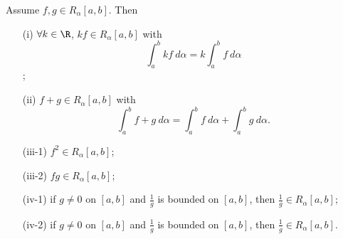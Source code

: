 \begin{theorem}\label{Algebraic properties of R.S integral}
    Assume \( f,g \in {R}_{\alpha}[a,b] \). Then
    \begin{enumerate}
        \item[(i)] \( \forall k \in \R  \), \( kf \in {R}_{\alpha}[a,b] \) with \[ \int_{ a }^{ b }  kf  \ d \alpha = k \int_{ a }^{ b }  f  \ d \alpha \];
        \item[(ii)] \( f + g \in {R}_{\alpha}[a,b] \) with 
            \[  \int_{ a }^{ b }  f + g  \ d \alpha = \int_{ a }^{ b }  f  \ d \alpha  + \int_{ a }^{ b }  g  \ d \alpha. \]
        \item[(iii-1)]  \( f^{2} \in {R}_{\alpha}[a,b] \);
        \item[(iii-2)] \( fg \in {R}_{\alpha}[a,b] \);
        \item[(iv-1)] if \( g \neq 0  \) on \( [a,b] \) and \( \frac{ 1 }{ g }  \) is bounded on \( [a,b] \), then \( \frac{ 1 }{ g }  \in {R}_{\alpha}[a,b] \);
        \item[(iv-2)] if \( g \neq 0  \) on \( [a,b] \) and \( \frac{ 1 }{ g }   \) is bounded on \( [a,b] \), then \( \frac{ 1 }{ g }  \in {R}_{\alpha}[a,b] \).
    \end{enumerate}
\end{theorem}




